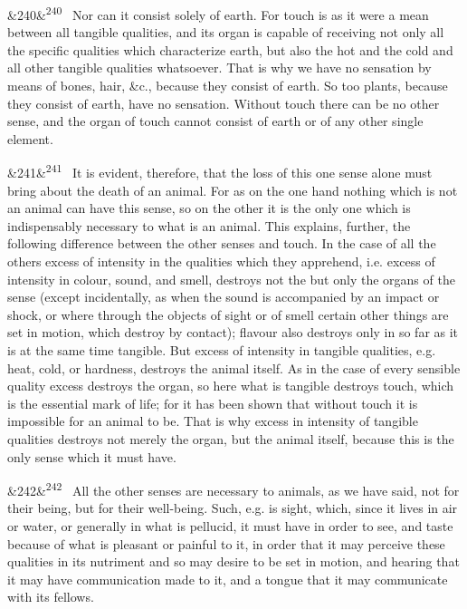 \documentclass[12pt]{article}
\newcommand{\para}[1][]{\par\noindent\ifx&#1&\else\textsuperscript{\footnotesize #1}~\fi}
\begin{document}
\para[240] Nor can it consist solely of earth. For touch is as it were a mean between all tangible qualities, and its organ is capable of receiving not only all the specific qualities which characterize earth, but also the hot and the cold and all other tangible qualities whatsoever. That is why we have no sensation by means of bones, hair, \&c., because they consist of earth. So too plants, because they consist of earth, have no sensation. Without touch there can be no other sense, and the organ of touch cannot consist of earth or of any other single element.

\para[241] It is evident, therefore, that the loss of this one sense alone must bring about the death of an animal. For as on the one hand nothing which is not an animal can have this sense, so on the other it is the only one which is indispensably necessary to what is an animal. This explains, further, the following difference between the other senses and touch. In the case of all the others excess of intensity in the qualities which they apprehend, i.e. excess of intensity in colour, sound, and smell, destroys not the but only the organs of the sense (except incidentally, as when the sound is accompanied by an impact or shock, or where through the objects of sight or of smell certain other things are set in motion, which destroy by contact); flavour also destroys only in so far as it is at the same time tangible. But excess of intensity in tangible qualities, e.g. heat, cold, or hardness, destroys the animal itself. As in the case of every sensible quality excess destroys the organ, so here what is tangible destroys touch, which is the essential mark of life; for it has been shown that without touch it is impossible for an animal to be. That is why excess in intensity of tangible qualities destroys not merely the organ, but the animal itself, because this is the only sense which it must have.

\para[242] All the other senses are necessary to animals, as we have said, not for their being, but for their well-being. Such, e.g. is sight, which, since it lives in air or water, or generally in what is pellucid, it must have in order to see, and taste because of what is pleasant or painful to it, in order that it may perceive these qualities in its nutriment and so may desire to be set in motion, and hearing that it may have communication made to it, and a tongue that it may communicate with its fellows.
\end{document}
